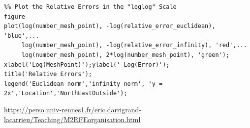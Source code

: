 \documentclass[11pt,a4paper,center,notitlepage]{article}
\numberwithin{equation}{section}
\begin{document}
\begin{verbatim}
%% Plot the Relative Errors in the "loglog" Scale
figure
plot(log(number_mesh_point), -log(relative_error_euclidean), 'blue',...
     log(number_mesh_point), -log(relative_error_infinity), 'red',...
     log(number_mesh_point), 2*log(number_mesh_point), 'green');
xlabel('Log(MeshPoint)');ylabel('-Log(Error)');
title('Relative Errors');
legend('Euclidean norm','infinity norm', 'y = 2x','Location','NorthEastOutside');  
\end{verbatim}









\newpage
\begin{thebibliography}{999}
 \url{https://perso.univ-rennes1.fr/eric.darrigrand-lacarrieu/Teaching/M2RFEorganisation.html}
\end{thebibliography}
%
%
\end{document}
